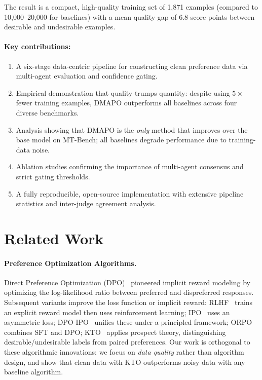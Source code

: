 \documentclass{article}
\newcommand{\ours}{\textsc{DMAPO}}
\begin{document}
The result is a compact, high-quality training set of 1,871 examples (compared to 10,000--20,000 for baselines) with a mean quality gap of 6.8 score points between desirable and undesirable examples.

\paragraph{Key contributions:}
\begin{enumerate}[leftmargin=*,itemsep=0.5ex]
  \item A six-stage data-centric pipeline for constructing clean preference data via multi-agent evaluation and confidence gating.
  \item Empirical demonstration that quality trumps quantity: despite using $5\times$ fewer training examples, \ours{} outperforms all baselines across four diverse benchmarks.
  \item Analysis showing that \ours{} is the \emph{only} method that improves over the base model on MT-Bench; all baselines degrade performance due to training-data noise.
  \item Ablation studies confirming the importance of multi-agent consensus and strict gating thresholds.
  \item A fully reproducible, open-source implementation with extensive pipeline statistics and inter-judge agreement analysis.
\end{enumerate}


\section{Related Work}
\label{sec:related}

\paragraph{Preference Optimization Algorithms.}
Direct Preference Optimization (DPO)~\cite{rafailov2023dpo} pioneered implicit reward modeling by optimizing the log-likelihood ratio between preferred and dispreferred responses.
Subsequent variants improve the loss function or implicit reward: RLHF~\cite{ouyang2022training} trains an explicit reward model then uses reinforcement learning; IPO~\cite{azar2023general} uses an asymmetric loss; DPO-IPO~\cite{meng2024simpo,azar2024simpo} unifies these under a principled framework; ORPO~\cite{hong2024orpo} combines SFT and DPO; KTO~\cite{ethayarajh2024kto} applies prospect theory, distinguishing desirable/undesirable labels from paired preferences.
Our work is orthogonal to these algorithmic innovations: we focus on \emph{data quality} rather than algorithm design, and show that clean data with KTO outperforms noisy data with any baseline algorithm.
\end{document}
